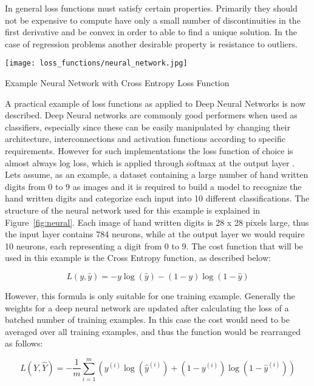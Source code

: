 In general loss functions must satisfy certain properties. Primarily they should not be expensive to compute \citep {Scholkopf:2001:LKS:559923} have only a small number of discontinuities in the first derivative and be convex in order to able to find a unique solution. In the case of regression problems another desirable property is resistance to outliers.

\begin{marginfigure}%
	\texttt{[image: loss\_functions/neural\_network.jpg]}
	\caption{Example Neural Network with Cross Entropy Loss Function}
	\label{fig:neural}
\end{marginfigure}

A practical example of loss functions as applied to Deep Neural Networks is now described.  Deep Neural networks are commonly good performers when used as classifiers, especially since these can be easily manipulated by changing their architecture, interconnections and activation functions according to specific requirements. However for such implementations the loss function of choice is almost always log loss, which is applied through softmax at the output layer \citep {DBLP:journals/corr/JanochaC17}. Lets assume, as an example, a dataset containing a large number of hand written digits from 0 to 9 as images and it is required to build a model  to recognize the hand written digits and categorize each input into 10 different classifications. The structure of the neural network used for this example is explained in Figure~\ref{fig:neural}. Each image of hand written digits is 28 x 28 pixels large, thus the input layer contains 784 neurons, while at the output layer we would require 10 neurons, each representing a digit from 0 to 9. The cost function that will be used in this example is the Cross Entropy function, as described below:

\begin{equation}
L(y, \hat{y}) = -y \log(\hat{y}) - (1-y) \log(1-\hat{y})
\end{equation}

However, this formula is only suitable for one training example. Generally the weights for a deep neural network are updated after calculating the loss of a batched number of training examples. In this case the cost would need to be averaged over all training examples, and thus the function would be rearranged as follows:

\begin{equation}
L(Y, \hat{Y}) = -\frac{1}{m} \sum_{i=1}^m \left( y^{(i)} \log(\hat{y}^{(i)}) + (1-y^{(i)}) \log(1-\hat{y}^{(i)}) \right)
\end{equation}


